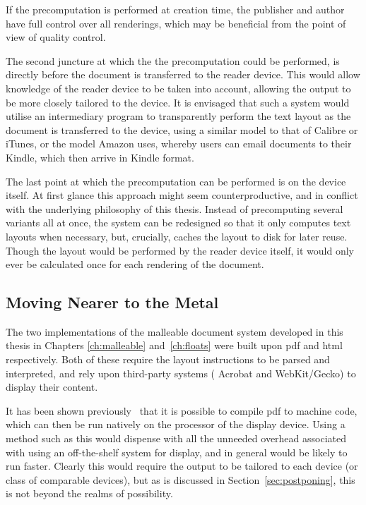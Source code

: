 If the precomputation is performed at creation time, the publisher and author have full control over all renderings, which may be beneficial from the point of view of quality control. 

The second juncture at which the the precomputation could be performed, is directly before the document is transferred to the reader device. This would allow knowledge of the reader device to be taken into account, allowing the output to be more closely tailored to the device. It is envisaged that such a system would utilise an intermediary program to transparently perform the text layout as the document is transferred to the device, using a similar model to that of Calibre or iTunes, or the model Amazon uses, whereby users can email documents to their Kindle, which then arrive in Kindle format.

The last point at which the precomputation can be performed is on the device itself. At first glance this approach might seem counterproductive, and in conflict with the underlying philosophy of this thesis. Instead of precomputing several variants all at once, the system can be redesigned so that it only computes text layouts when necessary, but, crucially, caches the layout to disk for later reuse. Though the layout would be performed by the \ebook{} reader device itself, it would only ever be calculated once for each rendering of the document.

\subsection{Moving Nearer to the Metal}
The two implementations of the malleable document system developed in this thesis in Chapters \ref{ch:malleable} and~\ref{ch:floats} were built upon \gls{pdf} and \gls{html} respectively. Both of these require the layout instructions to be parsed and interpreted, and rely upon third-party systems (\ie{} Acrobat and WebKit/Gecko) to display their content.

It has been shown previously~\cite{Bagley2010} that it is possible to compile \gls{pdf} to machine code, which can then be run natively on the processor of the display device. Using a method such as this would dispense with all the unneeded overhead associated with using an off-the-shelf system for display, and in general would be likely to run faster. Clearly this would require the output to be tailored to each device (or class of comparable devices), but as is discussed in Section~\ref{sec:postponing}, this is not beyond the realms of possibility.



